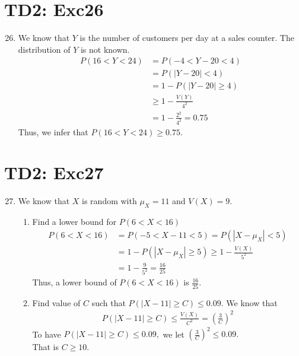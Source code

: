 \documentclass[serif,t]{beamer}
\begin{document}
    \section{TD2: Exc26}
    \begin{frame}[allowframebreaks]
        \begin{enumerate}
            \setcounter{enumi}{25}
            \item We know that $ Y $ is the number of customers per day at a sales counter. The distribution of $ Y $ is not known.
            \begin{align*}
            P(16<Y<24) &=P(-4<Y-20<4)\\
            &=P(|Y-20|<4)\\
            &=1-P(|Y-20|\geq 4)\\
            &\geq 1-\frac{V(Y)}{4^{2}}\\
            &=1-\frac{2^{2}}{4^{2}}=0.75
            \end{align*}
            Thus, we infer that $ P(16<Y<24)\geq 0.75. $
        \end{enumerate}
    \end{frame}
    \section{TD2: Exc27}
    \begin{frame}[allowframebreaks]
        \begin{enumerate}
            \setcounter{enumi}{26}
            \item We know that $ X $ is random with $ \mu_{X}=11 $ and $ V(X)=9. $
            \begin{enumerate}[a]
                \item Find a lower bound for $ P(6<X<16) $
                \begin{align*}
                P(6<X<16) &=P(-5<X-11<5)=P(|X-\mu_{X}|<5)\\
                &=1-P(|X-\mu_{X}|\geq 5)\geq 1-\frac{V(X)}{5^{2}}\\
                &=1-\frac{9}{5^{2}}=\frac{16}{25}
                \end{align*}
                Thus, a lower bound of $ P(6<X<16) $ is $ \frac{16}{25}. $
                \item Find value of $ C $ such that $ P(|X-11|\geq C)\leq 0.09. $ We know that
                \begin{align*}
                P(|X-11|\geq C)\leq \frac{V(X)}{C^{2}}=\left( \frac{3}{C} \right)^{2}
                \end{align*}
                To have $ P(|X-11|\geq C)\leq 0.09, $ we let $ \left( \frac{3}{C} \right)^{2}\leq 0.09. $\\
                That is $ C\geq 10. $
            \end{enumerate}
        \end{enumerate}
    \end{frame}
\end{document}
